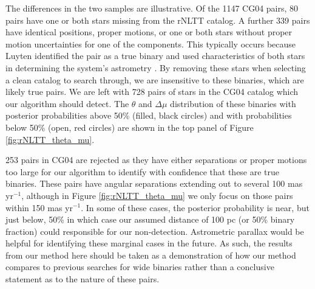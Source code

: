 \documentclass[usenatbib]{mnras}
\begin{document}



The differences in the two samples are illustrative. Of the 1147 CG04 pairs, 80 pairs have one or both stars missing from the rNLTT catalog. A further 339 pairs have identical positions, proper motions, or one or both stars without proper motion uncertainties for one of the components. This typically occurs because Luyten identified the pair as a true binary and used characteristics of both stars in determining the system's astrometry \citep{chaname04}. By removing these stars when selecting a clean catalog to search through, we are insensitive to these binaries, which are likely true pairs. We are left with 728 pairs of stars in the CG04 catalog which our algorithm should detect. The $\theta$ and $\Delta \mu$ distribution of these binaries with posterior probabilities above 50\% (filled, black circles) and with probabilities below 50\% (open, red circles) are shown in the top panel of Figure \ref{fig:rNLTT_theta_mu}. 


253 pairs in CG04 are rejected as they have either separations or proper motions too large for our algorithm to identify with confidence that these are true binaries. These pairs have angular separations extending out to several 100 mas yr$^{-1}$, although in Figure \ref{fig:rNLTT_theta_mu} we only focus on those pairs within 150 mas yr$^{-1}$. In some of these cases, the posterior probability is near, but just below, 50\% in which case our assumed distance of 100 pc (or 50\% binary fraction) could responsible for our non-detection. Astrometric parallax would be helpful for identifying these marginal cases in the future. As such, the results from our method here should be taken as a demonstration of how our method compares to previous searches for wide binaries rather than a conclusive statement as to the nature of these pairs.
\end{document}
